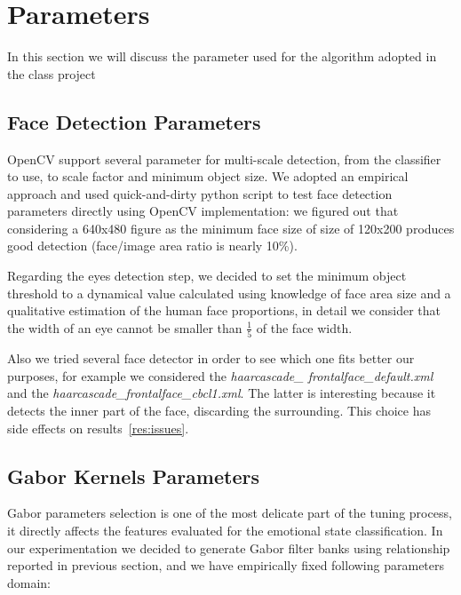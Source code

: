 \section{Parameters}

In this section we will discuss the parameter used for the algorithm adopted in the class project

\subsection{Face Detection Parameters}

OpenCV support several parameter for multi-scale detection, from the classifier to use, to scale factor and minimum object size. We adopted an empirical approach and used quick-and-dirty python script to test face detection parameters directly using OpenCV implementation: we figured out that considering a 640x480 figure as the minimum face size of size of 120x200 produces good detection (face/image area ratio is nearly 10\%). 

Regarding the eyes detection step, we decided to set the minimum object threshold to a dynamical value calculated using knowledge of face area size and a qualitative estimation of the human face proportions, in detail we consider that the width of an eye cannot be smaller than $\frac{1}{5}$ of the face width.

Also we tried several face detector in order to see which one fits better our purposes, for example we considered the \emph{haarcascade\_ frontalface\_default.xml} and the \emph{haarcascade\_frontalface\_cbcl1.xml}. The latter is interesting because it detects the inner part of the face, discarding the surrounding. This choice has side effects on results~\ref{res:issues}.

\subsection{Gabor Kernels Parameters}

Gabor parameters selection is one of the most delicate part of the tuning process, it directly affects the features evaluated for the emotional state classification. 
In our experimentation we decided to generate Gabor filter banks using relationship reported in previous section, and we have empirically fixed following parameters domain:


